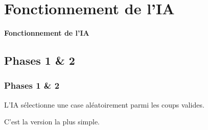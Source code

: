 \documentclass[9pt]{beamer}
\begin{document}
\section{Fonctionnement de l'IA}
\begin{frame}
  \begin{center}
      \Large \textbf{Fonctionnement de l'IA}
  \end{center}
\end{frame}

\subsection{Phases 1 \& 2}
\begin{frame}
  \frametitle{Phases 1 \& 2}
  L’IA sélectionne une case aléatoirement parmi les coups valides.

  C’est la version la plus simple.
\end{frame}
\end{document}
